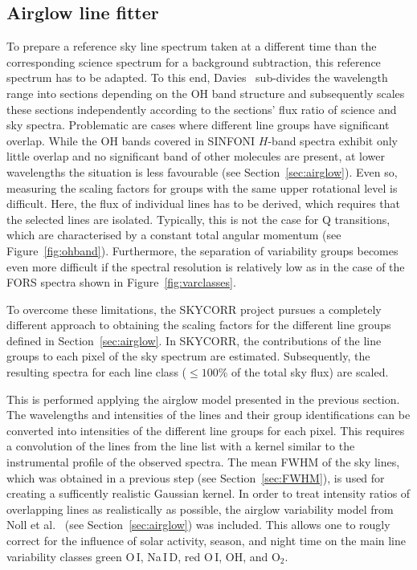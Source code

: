 \subsection{Airglow line fitter}\label{sec:linefit}
To prepare a reference sky line spectrum taken at a different time than the
corresponding science spectrum for a background subtraction, this reference
spectrum has to be adapted. To this end, Davies~\cite{DAV07} sub-divides the
wavelength range into sections depending on the OH band structure and
subsequently scales these sections independently according to the sections'
flux ratio of science and sky spectra. Problematic are cases where different
line groups have significant overlap. While the OH bands covered in SINFONI
$H$-band spectra exhibit only little overlap and no significant band of other
molecules are present, at lower wavelengths the situation is less favourable
(see Section~\ref{sec:airglow}). Even so, measuring the scaling factors for
groups with the same upper rotational level is difficult. Here, the flux of
individual lines has to be derived, which requires that the selected lines are
isolated. Typically, this is not the case for Q transitions, which are
characterised by a constant total angular momentum (see
Figure~\ref{fig:ohband}). Furthermore, the separation of variability groups
becomes even more difficult if the spectral resolution is relatively low as in
the case of the FORS spectra shown in Figure~\ref{fig:varclasses}.

To overcome these limitations, the SKYCORR project pursues a completely
different approach to obtaining the scaling factors for the different line
groups defined in Section~\ref{sec:airglow}. In SKYCORR, the contributions of
the line groups to each pixel of the sky spectrum are estimated. Subsequently,
the resulting spectra for each line class ($\le 100$\% of the total sky flux)
are scaled.

This is performed applying the airglow model presented in the previous section.
The wavelengths and intensities of the lines and their group identifications
can be converted into intensities of the different line groups for each pixel.
This requires a convolution of the lines from the line list with a kernel
similar to the instrumental profile of the observed spectra. The mean FWHM of
the sky lines, which was obtained in a previous step (see
Section~\ref{sec:FWHM}), is used for creating a sufficently realistic Gaussian
kernel. In order to treat intensity ratios of overlapping lines as
realistically as possible, the airglow variability model from Noll et
al.~\cite{NOL12} (see Section~\ref{sec:airglow}) was included. This allows one
to rougly correct for the influence of solar activity, season, and night time
on the main line variability classes green O\,I, Na\,I\,D, red O\,I, OH, and
O$_2$.

